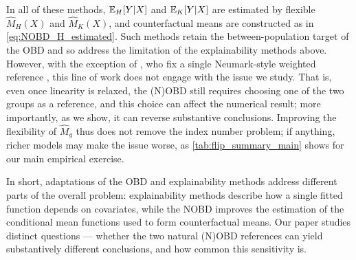 In all of these methods, $\mathbb{E}_H[Y|X]$ and $\mathbb{E}_K[Y|X]$ are estimated by flexible $\hat{M}_H(X)$ and $\hat{M}_K(X)$, and counterfactual means are constructed as in \cref{eq:NOBD_H_estimated}.
Such methods retain the between-population target of the OBD and so address the limitation of the explainability methods above.
However, with the exception of \citet{flachaire2025decomposing}, who fix a single Neumark-style weighted reference \citep{neumark1988}, this line of work does not engage with the issue we study.
That is, even once linearity is relaxed, the (N)OBD still requires choosing one of the two groups as a reference, and this choice can affect the numerical result; more importantly, as we show, it can reverse substantive conclusions.
Improving the flexibility of $\hat{M}_g$ thus does not remove the index number problem; if anything, richer models may make the issue worse, as \cref{tab:flip_summary_main} shows for our main empirical exercise.

In short, adaptations of the OBD and explainability methods address different parts of the overall problem: explainability methods describe how a single fitted function depends on covariates, while the NOBD improves the estimation of the conditional mean functions used to form counterfactual means.
Our paper studies distinct questions --- whether the two natural (N)OBD references can yield substantively different conclusions, and how common this sensitivity is.
